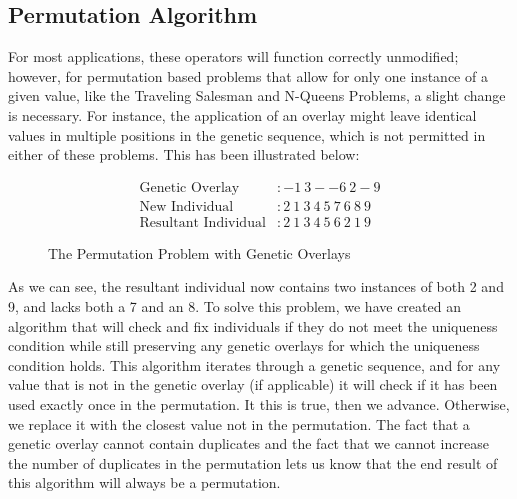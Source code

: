 \subsection*{Permutation Algorithm}
For most applications, these operators will function correctly unmodified; however, for permutation based problems that allow for only one instance of a given value, like the Traveling Salesman and N-Queens Problems, a slight change is necessary. For instance, the application of an overlay might leave identical values in multiple positions in the genetic sequence, which is not permitted in either of these problems. This has been illustrated below: 
\begin{figure}[h!]
\centering 
\begin{align*}
\text{Genetic Overlay} &:   -1~3--6~2-9				\\
\text{New Individual} &: 2~1~3~4~5~7~6~8~9			\\		
\text{Resultant Individual} &: 2~1~3~4~5~6~2~1~9
\end{align*}
\caption{The Permutation Problem with Genetic Overlays}
\end{figure}

As we can see, the resultant individual now contains two instances of both 2 and 9, and lacks both a 7 and an 8. To solve this problem, we have created an algorithm that will check and fix individuals if they do not meet the uniqueness condition while still preserving any genetic overlays for which the uniqueness condition holds. This algorithm iterates through a genetic sequence, and for any value that is not in the genetic overlay (if applicable) it will check if it has been used exactly once in the permutation. It this is true, then we advance. Otherwise, we replace it with the closest value not in the permutation. The fact that a genetic overlay cannot contain duplicates and the fact that we cannot increase the number of duplicates in the permutation lets us know that the end result of this algorithm will always be a permutation. 